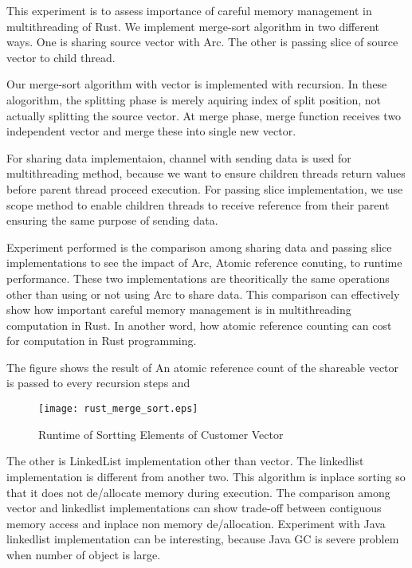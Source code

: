 This experiment is to assess importance of careful memory management in multithreading of Rust. 
We implement merge-sort algorithm in two different ways. One is sharing source vector with Arc. 
The other is passing slice of source vector to child thread. 

Our merge-sort algorithm with vector is implemented with recursion. In these alogorithm, the splitting phase is merely aquiring index of split position, 
not actually splitting the source vector. At merge phase, merge function receives two independent vector and merge these into single new vector.

For sharing data implementaion, channel with sending data is used for multithreading method, because we want to ensure children threads return values before parent thread proceed execution. 
For passing slice implementation, we use scope method to enable children threads to receive reference from their parent ensuring the same purpose of sending data. 

Experiment performed is the comparison among sharing data and passing slice implementations to see the impact of Arc, Atomic reference conuting, to runtime performance.
These two implementations are theoritically the same operations other than using or not using Arc to share data. 
This comparison can effectively show how important careful memory management is in multithreading computation in Rust. 
In another word, how atomic reference counting can cost for computation in Rust programming.

The figure shows the result of 
An atomic reference count of the shareable vector is passed to every recursion steps and 


\begin{figure}[htb]
    \texttt{[image: rust\_merge\_sort.eps]}
    \caption{Runtime of Sortting Elements of Customer Vector}
    \label{fig:Sampling}
\end{figure}



The other is LinkedList implementation other than vector.
The linkedlist implementation is different from another two. This algorithm is inplace sorting so that it does not de/allocate memory during execution. 
The comparison among vector and linkedlist implementations can show trade-off between contiguous memory access and inplace non memory de/allocation. 
Experiment with Java linkedlist implementation can be interesting, because Java GC is severe problem when number of object is large. 